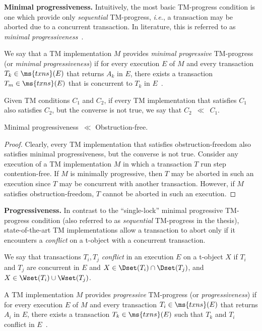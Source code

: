 \vspace{1mm}\noindent\textbf{Minimal progressiveness.}
Intuitively, the most basic TM-progress condition is one which provide only \emph{sequential} TM-progress, \emph{i.e.},
a transaction may be aborted due to a concurrent transaction.
In literature, this is referred to as \emph{minimal progressiveness}~\cite{tm-book}.
\begin{definition}
We say that a TM implementation $M$ provides \emph{minimal progressive} TM-progress (or \emph{minimal progressiveness}) 
if for every execution $E$ of $M$
and every transaction $T_k\in \ms{txns}(E)$ that returns $A_k$ in $E$, there exists a transaction $T_m\in \ms{txns}(E)$
that is concurrent to $T_k$ in $E$~\cite{tm-book}.
\end{definition}
Given TM conditions $C_1$ and $C_2$, if every TM implementation that satisfies 
$C_1$ also satisfies $C_2$, 
but the converse is not true, we say that $C_2$~$\ll$~$C_1$.
\begin{observation}
Minimal progressiveness~$\ll$ Obstruction-free.
\end{observation}
\begin{proof}
Clearly, every TM implementation that satisfies obstruction-freedom also satisfies minimal progressiveness, but the converse 
is not true.
Consider any execution of a TM implementation $M$ in which a transaction $T$ run step contention-free.
If $M$ is minimally progressive, then $T$ may be aborted in such an execution since $T$ may be concurrent with another transaction.
However, if $M$ satisfies obstruction-freedom, $T$ cannot be aborted in such an execution.
\end{proof}
\vspace{1mm}\noindent\textbf{Progressiveness.}
In contrast to the ``single-lock'' minimal progressive TM-progress
condition (also referred to as \emph{sequential} TM-progress in the thesis), 
state-of-the-art TM implementations
allow a transaction to abort only if it encounters a \emph{conflict} on a 
t-object with a concurrent transaction.
\begin{definition}[Conflicts]
We say that transactions $T_i,T_j$ \emph{conflict} in an execution $E$ on a t-object $X$ if
$T_i$ and $T_j$ are concurrent in $E$ and $X\in\Dset(T_i)\cap\Dset(T_j)$,  and $X\in\Wset(T_i)\cup\Wset(T_j)$.
\end{definition}
\begin{definition}[Progressiveness]
\label{def:progdef}
A TM implementation $M$ provides \emph{progressive} TM-progress (or \emph{progressiveness}) 
if for every execution $E$ of $M$ and every transaction $T_i \in \ms{txns}(E)$ that returns $A_i$ in $E$,
there exists a transaction $T_k \in \ms{txns}(E)$ such that $T_k$ and $T_i$
conflict in $E$~\cite{tm-book}. 
\end{definition}
